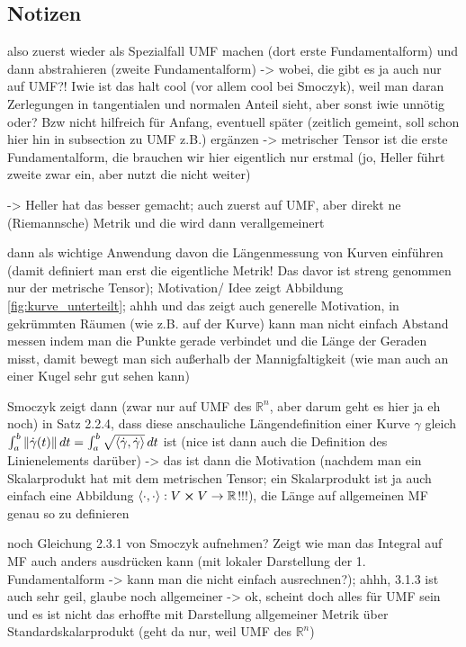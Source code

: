\documentclass[../H_Analysis_main.tex]{subfiles}
\begin{document}
		\subsection{Notizen}
also zuerst wieder als Spezialfall UMF machen (dort erste Fundamentalform) und dann abstrahieren (zweite Fundamentalform) -> wobei, die gibt es ja auch nur auf UMF?! Iwie ist das halt cool (vor allem cool bei Smoczyk), weil man daran Zerlegungen in tangentialen und normalen Anteil sieht, aber sonst iwie unnötig oder? Bzw nicht hilfreich für Anfang, eventuell später (zeitlich gemeint, soll schon hier hin in subsection zu UMF z.B.) ergänzen -> metrischer Tensor ist die erste Fundamentalform, die brauchen wir hier eigentlich nur erstmal (jo, Heller führt zweite zwar ein, aber nutzt die nicht weiter)

-> Heller hat das besser gemacht; auch zuerst auf UMF, aber direkt ne (Riemannsche) Metrik und die wird dann verallgemeinert


dann als wichtige Anwendung davon die Längenmessung von Kurven einführen (damit definiert man erst die eigentliche Metrik! Das davor ist streng genommen nur der metrische Tensor); Motivation/ Idee zeigt Abbildung \ref{fig:kurve_unterteilt}; ahhh und das zeigt auch generelle Motivation, in gekrümmten Räumen (wie z.B. auf der Kurve) kann man nicht einfach Abstand messen indem man die Punkte gerade verbindet und die Länge der Geraden misst, damit bewegt man sich außerhalb der Mannigfaltigkeit (wie man auch an einer Kugel sehr gut sehen kann)



Smoczyk zeigt dann (zwar nur auf UMF des $\mathbb{R}^n$, aber darum geht es hier ja eh noch) in Satz 2.2.4, dass diese anschauliche Längendefinition einer Kurve $\gamma$ gleich $\int_a^b \norm{\dot{\gamma}(t)} \, dt = \int_a^b \sqrt{\langle \dot{\gamma}, \dot{\gamma} \rangle} \, dt$ ist (nice ist dann auch die Definition des Linienelements darüber) -> das ist dann die Motivation (nachdem man ein Skalarprodukt hat mit dem metrischen Tensor; ein Skalarprodukt ist ja auch einfach eine Abbildung $\langle \cdot, \cdot \rangle: V \cross V \rightarrow \mathbb{R}$!!!), die Länge auf allgemeinen MF genau so zu definieren



noch Gleichung 2.3.1 von Smoczyk aufnehmen? Zeigt wie man das Integral auf MF auch anders ausdrücken kann (mit lokaler Darstellung der 1. Fundamentalform -> kann man die nicht einfach ausrechnen?); ahhh, 3.1.3 ist auch sehr geil, glaube noch allgemeiner -> ok, scheint doch alles für UMF sein und es ist nicht das erhoffte mit Darstellung allgemeiner Metrik über Standardskalarprodukt (geht da nur, weil UMF des $\mathbb{R}^n$)
\end{document}
